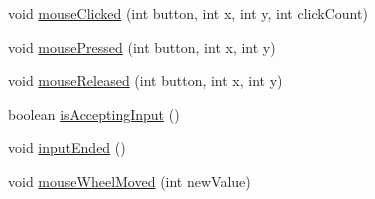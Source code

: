 \begin{DoxyCompactItemize}
\item 
void \mbox{\hyperlink{classorg_1_1newdawn_1_1slick_1_1state_1_1_state_based_game_a79113474361d715e01ac3be4a2c100d0}{mouse\+Clicked}} (int button, int x, int y, int click\+Count)
\item 
void \mbox{\hyperlink{classorg_1_1newdawn_1_1slick_1_1state_1_1_state_based_game_ab6809563aa70d14d4ed26294d248e871}{mouse\+Pressed}} (int button, int x, int y)
\item 
void \mbox{\hyperlink{classorg_1_1newdawn_1_1slick_1_1state_1_1_state_based_game_a46e077bbb1c01efe0c24513a6e759df8}{mouse\+Released}} (int button, int x, int y)
\item 
boolean \mbox{\hyperlink{classorg_1_1newdawn_1_1slick_1_1state_1_1_state_based_game_ab5c47ea171308ec7dac850d2739d79e4}{is\+Accepting\+Input}} ()
\item 
void \mbox{\hyperlink{classorg_1_1newdawn_1_1slick_1_1state_1_1_state_based_game_a299be9ff0a3a53cb265ff688c19e70e9}{input\+Ended}} ()
\item 
void \mbox{\hyperlink{classorg_1_1newdawn_1_1slick_1_1state_1_1_state_based_game_a58843de40efec58100335c27499d1bd2}{mouse\+Wheel\+Moved}} (int new\+Value)
\end{DoxyCompactItemize}
